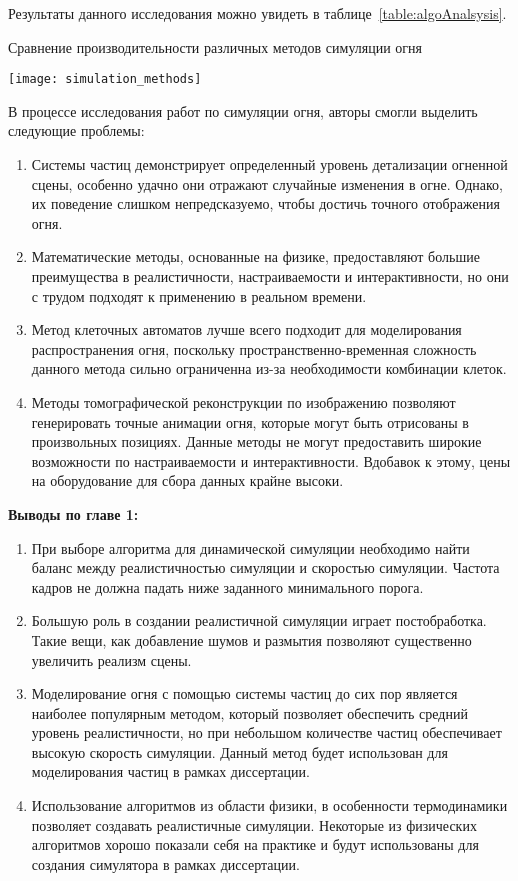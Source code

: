 Результаты данного исследования можно увидеть в таблице~\ref{table:algoAnalsysis}.
\begin{table}[htb]
    \caption{Сравнение производительности различных методов симуляции огня}
    \texttt{[image: simulation\_methods]}%
    \label{table:algoAnalsysis}
\end{table}

В процессе исследования работ по симуляции огня, авторы смогли выделить
следующие проблемы:
\begin{enumerate}
    \item Системы частиц демонстрирует определенный уровень детализации огненной
        сцены, особенно удачно они отражают случайные изменения в огне. Однако,
        их поведение слишком непредсказуемо, чтобы достичь точного отображения
        огня.
    \item Математические методы, основанные на физике, предоставляют большие
        преимущества в реалистичности, настраиваемости и интерактивности, но они
        с трудом подходят к применению в реальном времени.
    \item Метод клеточных автоматов лучше всего подходит для моделирования
        распространения огня, поскольку пространственно-временная сложность
        данного метода сильно ограниченна из-за необходимости комбинации клеток.
    \item Методы томографической реконструкции по изображению позволяют
        генерировать точные анимации огня, которые могут быть отрисованы в
        произвольных позициях. Данные методы не могут предоставить широкие
        возможности по настраиваемости и интерактивности. Вдобавок к этому, цены
        на оборудование для сбора данных крайне высоки.
\end{enumerate}

\textbf{Выводы по главе 1:}
\begin{enumerate}
    \item При выборе алгоритма для динамической симуляции необходимо найти
        баланс между реалистичностью симуляции и скоростью симуляции. Частота
        кадров не должна падать ниже заданного минимального порога.
    \item Большую роль в создании реалистичной симуляции играет постобработка.
        Такие вещи, как добавление шумов и размытия позволяют существенно
        увеличить реализм сцены.
    \item Моделирование огня с помощью системы частиц до сих пор является
        наиболее популярным методом, который позволяет обеспечить средний
        уровень реалистичности, но при небольшом количестве частиц обеспечивает
        высокую скорость симуляции. Данный метод будет использован для
        моделирования частиц в рамках диссертации.
    \item Использование алгоритмов из области физики, в особенности
        термодинамики позволяет создавать реалистичные симуляции. Некоторые из
        физических алгоритмов хорошо показали себя на практике и будут
        использованы для создания симулятора в рамках диссертации.
\end{enumerate}
